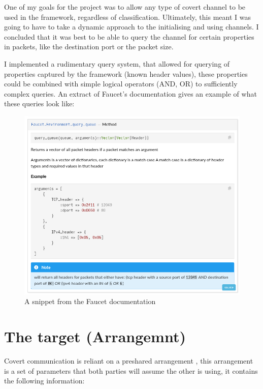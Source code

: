 One of my goals for the project was to allow any type of covert channel to be used in the framework, regardless of classification. Ultimately, this meant I was going to have to take a dynamic approach to the initialising and using channels. I concluded that it was best to be able to query the channel for certain properties in packets, like the destination port or the packet size.

I implemented a rudimentary query system, that allowed for querying of properties captured by the framework (known header values), these properties could be combined with simple logical operators (AND, OR) to sufficiently complex queries. An extract of Faucet's documentation gives an example of what these queries look like:

\begin{figure}[!h]
    \centering
    \includegraphics[width=\textwidth]{fig/docs_query_queue.png}
    \caption{A snippet from the Faucet documentation}
    \label{fig:doc_snippet}
\end{figure}

\section{The target (Arrangemnt)}
\label{sec:target}

Covert communication is reliant on a preshared arrangement \cite{DoCCaS}, this arrangement is a set of parameters that both parties will assume the other is using, it contains the following information:

